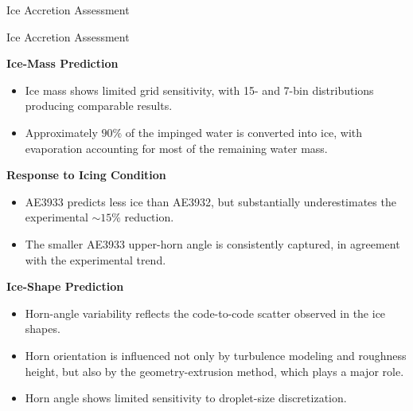 \begin{frame}{\small Ice Accretion Assessment}
\scriptsize

\begin{alertblock}{\scriptsize Ice Accretion Assessment}

\textbf{Ice-Mass Prediction}
\begin{itemize}
    \item Ice mass shows limited grid sensitivity, with 15- and 7-bin distributions producing comparable results.
    
    \item Approximately $90\%$ of the impinged water is converted into ice, with evaporation accounting for most of the remaining water mass.
\end{itemize}

\vspace{0.10cm}

\textbf{Response to Icing Condition}
\begin{itemize}
    \item AE3933 predicts less ice than AE3932, but substantially underestimates the experimental $\sim15\%$ reduction.
    
    \item The smaller AE3933 upper-horn angle is consistently captured, in agreement with the experimental trend.
\end{itemize}

\vspace{0.10cm}

\textbf{Ice-Shape Prediction}
\begin{itemize}
    \item Horn-angle variability reflects the code-to-code scatter observed in the ice shapes.
    
    \item Horn orientation is influenced not only by turbulence modeling and roughness height, but also by the geometry-extrusion method, which plays a major role.
    
    \item Horn angle shows limited sensitivity to droplet-size discretization.
\end{itemize}

\end{alertblock}

\end{frame}